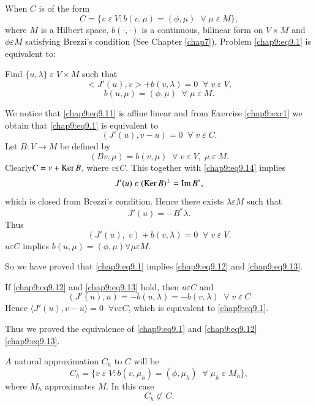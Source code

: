 \begin{case}\label{chap9:case2}
When $C$ is of the form
\begin{equation}\label{chap9:eq9.11}
C=\{v\;\varepsilon \;V:b(v,\mu)=(\phi,\mu)\; \; \forall \;\mu
\;\varepsilon \;M\},
\end{equation}
where $M$ is a Hilbert space, $b(\cdotp,\cdotp)$ is a continuous,
bilinear form on $V\times M$ and $\phi\varepsilon M$ satisfying
Brezzi's condition (See Chapter \ref{chap7}), Problem
\eqref{chap9:eq9.1} is equivalent to:

Find $\{u,\lambda\}\;\varepsilon \;V\times M$ such that
\begin{equation}\label{chap9:eq9.12}
<J'(u),v>+b(v,\lambda)=0\; \; \forall \;v \;\varepsilon \;V,
\end{equation}
\begin{equation}\label{chap9:eq9.13}
b(u,\mu)=(\phi,\mu)\; \; \forall \;\mu \;\varepsilon \;M.
\end{equation}

We notice that \eqref{chap9:eq9.11} is affine linear and from Exercise
\ref{chap9:exr1} we obtain that \eqref{chap9:eq9.1} is equivalent to
\begin{equation}\label{chap9:eq9.14}
(J'(u),v-u)=0\; \; \forall \;v \;\varepsilon \;C.
\end{equation}
Let $B:V\to M$ be defined by 
$$
(Bv,\mu)=b(v,\mu)\; \; \forall \;v \;\varepsilon \;V, \;\mu \;\varepsilon
\;M.
$$
Clearly\pageoriginale $C=v+\operatorname{Ker} B$, where $v\varepsilon C$. This
together with \eqref{chap9:eq9.14} implies
$$
J'(u)\;\varepsilon \;(\operatorname{Ker} B)^\bot=\operatorname{Im} B^*,
$$
which is closed from Brezzi's condition. Hence there exists $\lambda
\varepsilon M$ such that
$$
J'(u)=-B^*\lambda.
$$
Thus
$$
(J'(u), \;v)+b(v,\lambda)=0\; \; \forall \;v\;\varepsilon \;V.
$$
$u\varepsilon C$ implies $b(u,\mu)=(\phi,\mu)\forall \mu\varepsilon
M$.

So we have proved that \eqref{chap9:eq9.1} implies
\eqref{chap9:eq9.12} and \eqref{chap9:eq9.13}.

If \eqref{chap9:eq9.12} and \eqref{chap9:eq9.13} hold, then
$u\varepsilon C$ and 
$$
(J'(u),u)=-b(u,\lambda)=-b(v,\lambda)\; \; \forall \;v\;\varepsilon \;C
$$
Hence $ \langle J'(u),v-u \rangle =0 \; \; \forall v\varepsilon C$, which is equivalent to \eqref{chap9:eq9.1}. 

Thus we proved the equivalence of \eqref{chap9:eq9.1} and
\eqref{chap9:eq9.12} \eqref{chap9:eq9.13}.

$A$ natural approximation $C_h$ to $C$ will be 
$$
C_h=\{v\;\varepsilon \;V:b(v,\mu_h)=(\phi,\mu_h)\; \; \forall \;\mu_h
\;\varepsilon \;M_h\},
$$
where $M_h$ approximates $M$. In this case 
$$
C_h\nsubset C.
$$
\end{case}

